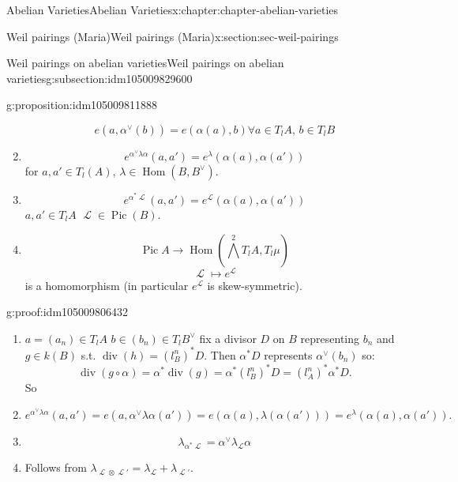 \documentclass[oneside,10pt,]{book}
\numberwithin{equation}{section}
\newcommand{\sheaf}[1]{\operatorname{\mathcal{#1}}}
\DeclareMathOperator{\Hom}{Hom}
\DeclareMathOperator{\divisor}{div}
\DeclareMathOperator{\Pic}{Pic}
\begin{document}
\begin{chapterptx}{Abelian Varieties}{}{Abelian Varieties}{}{}{x:chapter:chapter-abelian-varieties}
\begin{sectionptx}{Weil pairings (Maria)}{}{Weil pairings (Maria)}{}{}{x:section:sec-weil-pairings}
\begin{subsectionptx}{Weil pairings on abelian varieties}{}{Weil pairings on abelian varieties}{}{}{g:subsection:idm105009829600}
\begin{proposition}{}{}{g:proposition:idm105009811888}
\begin{enumerate}
\begin{equation*}
e(a,\alpha^\vee(b)) = e(\alpha (a), b) \forall a \in T_lA,\,b\in T_l B
\end{equation*}
%
\item{}%
\begin{equation*}
e^{\alpha^\vee \lambda \alpha}(a,a') = e ^\lambda (\alpha(a), \alpha(a'))
\end{equation*}
for \(a,a' \in T_l(A)\), \(\lambda \in \Hom(B,B^\vee)\).%
\item{}%
\begin{equation*}
e^{\alpha^* \sheaf L} (a,a') = e^{\sheaf L}(\alpha (a),\alpha(a'))
\end{equation*}
\(a,a'\in T_lA\) \(\sheaf L\in \Pic(B)\).%
\item{}%
\begin{equation*}
\Pic A  \to \Hom( \bigwedge^2 T_lA , T_l\mu)
\end{equation*}
%
\begin{equation*}
\sheaf L \mapsto e^{\sheaf L}
\end{equation*}
is a homomorphism (in particular \(e^{\sheaf L}\) is  skew-symmetric).%
\end{enumerate}
%
\end{proposition}
\begin{proofptx}{}{g:proof:idm105009806432}
%
\begin{enumerate}
\item{}\(a = (a_n) \in T_lA\) \(b\in (b_n) \in T_l B^\vee\) fix a divisor \(D \) on \(B\) representing \(b_n\) and \(g\in k(B)\) s.t. \(\divisor (h) = (l^n_B)^* D\). Then \(\alpha^* D\) represents \(\alpha^\vee(b_n)\) so:%
\begin{equation*}
\divisor(g\circ \alpha) = \alpha^*\divisor (g) = \alpha^*(l^n_B)^* D = (l_A^n)^* \alpha^* D\text{.}
\end{equation*}
So%
\item{}%
\begin{equation*}
e^{\alpha^{\vee}\lambda \alpha} (a,a') = e(a, \alpha^\vee\lambda \alpha(a')) = e(\alpha(a),\lambda (\alpha(a'))) = e^\lambda (\alpha(a), \alpha(a'))\text{.}
\end{equation*}
%
\item{}%
\begin{equation*}
\lambda_{\alpha^* \sheaf L} = \alpha^\vee \lambda_{\sheaf L} \alpha
\end{equation*}
%
\item{}Follows from \(\lambda_{\sheaf L\otimes \sheaf L'} = \lambda_{\sheaf L} + \lambda_{\sheaf L'}\).%
\end{enumerate}

\end{proofptx}
\end{subsectionptx}
\end{sectionptx}
\end{chapterptx}
\end{document}

